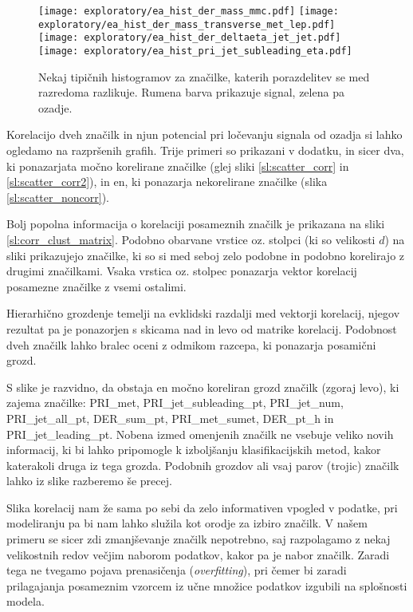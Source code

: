 \documentclass[11pt,a4paper,openany]{book}
\begin{document}
\begin{figure}[ht]
	\texttt{[image: exploratory/ea\_hist\_der\_mass\_mmc.pdf]}
	\texttt{[image: exploratory/ea\_hist\_der\_mass\_transverse\_met\_lep.pdf]}	
	\texttt{[image: exploratory/ea\_hist\_der\_deltaeta\_jet\_jet.pdf]}		
	\texttt{[image: exploratory/ea\_hist\_pri\_jet\_subleading\_eta.pdf]}	
	\caption{Nekaj tipičnih histogramov za značilke, katerih porazdelitev se med razredoma razlikuje. Rumena barva prikazuje signal, zelena pa ozadje.}
	\label{sl:histogrami}			
\end{figure}

Korelacijo dveh značilk in njun potencial pri ločevanju signala od ozadja si lahko ogledamo na razpršenih grafih. Trije primeri so prikazani v dodatku, in sicer dva, ki ponazarjata močno korelirane značilke (glej sliki \ref{sl:scatter_corr} in \ref{sl:scatter_corr2}), in en, ki ponazarja nekorelirane značilke (slika \ref{sl:scatter_noncorr}).

Bolj popolna informacija o korelaciji posameznih značilk je prikazana na sliki \ref{sl:corr_clust_matrix}. Podobno obarvane vrstice oz. stolpci (ki so velikosti $d$) na sliki prikazujejo značilke, ki so si med seboj zelo podobne in podobno korelirajo z drugimi značilkami. Vsaka vrstica oz. stolpec ponazarja vektor korelacij posamezne značilke z vsemi ostalimi.

Hierarhično grozdenje temelji na evklidski razdalji med vektorji korelacij, njegov rezultat pa je ponazorjen s skicama nad in levo od matrike korelacij. Podobnost dveh značilk lahko bralec oceni z odmikom razcepa, ki ponazarja posamični grozd.

S slike je razvidno, da obstaja en močno koreliran grozd značilk (zgoraj levo), ki zajema značilke: PRI\_met, PRI\_jet\_subleading\_pt, PRI\_jet\_num, PRI\_jet\_all\_pt, DER\_sum\_pt, PRI\_met\_sumet, DER\_pt\_h in PRI\_jet\_leading\_pt. Nobena izmed omenjenih značilk ne vsebuje veliko novih informacij, ki bi lahko pripomogle k izboljšanju klasifikacijskih metod, kakor katerakoli druga iz tega grozda. Podobnih grozdov ali vsaj parov (trojic) značilk lahko iz slike razberemo še precej.

Slika korelacij nam že sama po sebi da zelo informativen vpogled v podatke, pri modeliranju pa bi nam lahko služila kot orodje za izbiro značilk. V našem primeru se sicer zdi zmanjševanje značilk nepotrebno, saj razpolagamo z nekaj velikostnih redov večjim naborom podatkov, kakor pa je nabor značilk. Zaradi tega ne tvegamo pojava prenasičenja (\textit{overfitting}), pri čemer bi zaradi prilagajanja posameznim vzorcem iz učne množice podatkov izgubili na splošnosti modela.
\end{document}
